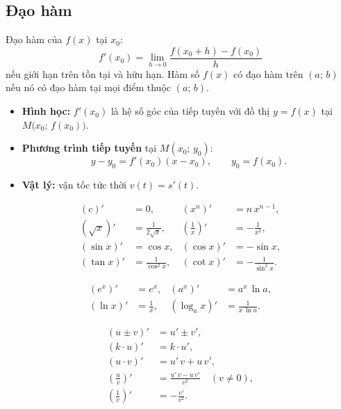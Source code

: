\documentclass[12pt,a4paper]{article}
\begin{document}
\subsection{Đạo hàm}

\begin{dinhnghia}
  Đạo hàm của $f(x)$ tại $x_0$:
  \[
    f'(x_0) = \lim_{h \to 0} \frac{f(x_0 + h) - f(x_0)}{h}
  \]
  nếu giới hạn trên tồn tại và hữu hạn. Hàm số $f(x)$ có đạo hàm trên $(a;\,b)$ nếu nó có đạo hàm tại mọi điểm thuộc $(a;\,b)$.
\end{dinhnghia}

\begin{dinhnghia}[title={Ý nghĩa}]
  \begin{itemize}
    \item \textbf{Hình học:} $f'(x_0)$ là hệ số góc của tiếp tuyến với đồ thị $y = f(x)$ tại $M\bigl(x_0;\, f(x_0)\bigr)$.
    \item \textbf{Phương trình tiếp tuyến} tại $M(x_0;\, y_0)$:
      \[
        y - y_0 = f'(x_0)(x - x_0), \qquad y_0 = f(x_0).
      \]
    \item \textbf{Vật lý:} vận tốc tức thời $v(t) = s'(t)$.
  \end{itemize}
\end{dinhnghia}

\begin{congthuc}[title={Bảng đạo hàm cơ bản}]
  \begin{align}
    (c)' &= 0, &
    (x^n)' &= n\,x^{n-1}, \\[2pt]
    (\sqrt{x})' &= \frac{1}{2\sqrt{x}}, &
    \left(\frac{1}{x}\right)' &= -\frac{1}{x^2}, \\[4pt]
    (\sin x)' &= \cos x, &
    (\cos x)' &= -\sin x, \\[2pt]
    (\tan x)' &= \frac{1}{\cos^2 x}, &
    (\cot x)' &= -\frac{1}{\sin^2 x}.
  \end{align}
\end{congthuc}

\begin{congthuc}[title={Đạo hàm hàm mũ -- logarit}]
  \begin{align}
    (e^x)' &= e^x, &
    (a^x)' &= a^x\,\ln a, \\[2pt]
    (\ln x)' &= \frac{1}{x}, &
    (\log_a x)' &= \frac{1}{x\,\ln a}.
  \end{align}
\end{congthuc}

\begin{congthuc}[title={Quy tắc tính đạo hàm}]
  \begin{align}
    (u \pm v)' &= u' \pm v', \\
    (k \cdot u)' &= k \cdot u', \\
    (u \cdot v)' &= u'\,v + u\,v', \\[2pt]
    \left(\frac{u}{v}\right)' &= \frac{u'\,v - u\,v'}{v^2} \quad (v \ne 0), \\[4pt]
    \left(\frac{1}{v}\right)' &= -\frac{v'}{v^2}.
  \end{align}
\end{congthuc}
\end{document}
